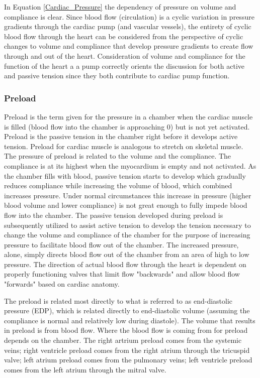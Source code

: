 In Equation \ref{Cardiac_Pressure} the dependency of pressure on volume and compliance is clear. Since blood flow (circulation) is a cyclic variation in pressure gradients through the cardiac pump (and vascular vessels), the entirety of cyclic blood flow through the heart can be considered from the perspective of cyclic changes to volume and compliance that develop pressure gradients to create flow through and out of the heart. Consideration of volume and compliance for the function of the heart a a pump correctly orients the discussion for both active and passive tension since they both contribute to cardiac pump function.

\subsubsection{Preload}

Preload is the term given for the pressure in a chamber when the cardiac muscle is filled (blood flow into the chamber is approaching 0) but is not yet activated. Preload is the passive tension in the chamber right before it develops active tension. Preload for cardiac muscle is analogous to stretch on skeletal muscle. The pressure of preload is related to the volume and the compliance. The compliance is at its highest when the myocardium is empty and not activated. As the chamber fills with blood, passive tension starts to develop which gradually reduces compliance while increasing the volume of blood, which combined increases pressure. Under normal circumstances this increase in pressure (higher blood volume and lower compliance) is not great enough to fully impede blood flow into the chamber. The passive tension developed during preload is subsequently utilized to assist active tension to develop the tension necessary to change the volume and compliance of the chamber for the purpose of increasing pressure to facilitate blood flow out of the chamber. The increased pressure, alone, simply directs blood flow out of the chamber from an area of high to low pressure. The direction of actual blood flow through the heart is dependent on properly functioning valves that limit flow "backwards" and allow blood flow "forwards" based on cardiac anatomy.

The preload is related most directly to what is referred to as end-diastolic pressure (EDP), which is related directly to end-diastolic volume (assuming the compliance is normal and relatively low during diastole). The volume that results in preload is from blood flow. Where the blood flow is coming from for preload depends on the chamber. The right artrium preload comes from the systemic veins; right ventricle preload comes from the right atrium through the tricuspid valve; left atrium preload comes from the pulmonary veins; left ventricle preload comes from the left atrium through the mitral valve. 

